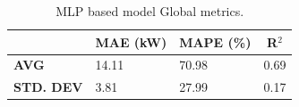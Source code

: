 \begin{table}[H]
	\centering
	\begin{tabular}{l|l|l|l}
		                                        &
		\multicolumn{1}{c|}{\textbf{MAE (kW)}}  &
		\multicolumn{1}{c|}{\textbf{MAPE (\%)}} &
		\multicolumn{1}{c}{\textbf{R$^2$}}                             \\
		\hline
		\textbf{AVG}                            & 14.11 & 70.98 & 0.69 \\
		\textbf{STD. DEV}                       & 3.81  & 27.99 & 0.17
	\end{tabular}
	\caption{MLP based model Global metrics.}
	\label{tab:globalmetrics}
\end{table}
%
